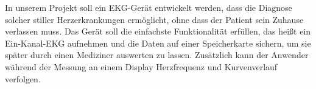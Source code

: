 In unserem Projekt soll ein EKG-Gerät entwickelt werden, dass die Diagnose solcher stiller Herzerkrankungen ermöglicht, ohne dass der Patient sein Zuhause verlassen muss. Das Gerät soll die einfachste Funktionalität erfüllen, das heißt ein Ein-Kanal-EKG aufnehmen und die Daten auf einer Speicherkarte sichern, um sie später durch einen Mediziner auswerten zu lassen. Zusätzlich kann der Anwender während der Messung an einem Display Herzfrequenz und Kurvenverlauf verfolgen. 





